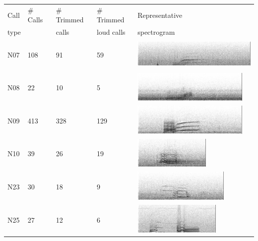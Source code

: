 \documentclass[12pt,oneside]{book}
\begin{document}
\begin{table}
\begin{tabular}{|l|l|l|l|l|}
\hline
Call     &  \# Calls  & \# Trimmed & \# Trimmed         &  Representative  \\
type     &            & calls      & loud calls         &  spectrogram    \\
\hline
 N07     &   108      &             91  &   59                    &  \includegraphics[height=1.5cm] {figures/catalog/A08-N07-071110-D013-01151.png} \\ \hline
 N08     &   22       &             10  &    5                    &  \includegraphics[height=1.5cm] {figures/catalog/A04-N08-071906-D020-13145.png} \\ \hline
 N09     &   413      &            328  &  129                    &  \includegraphics[height=1.5cm] {figures/catalog/A12-N09-070102-D005-14103.png} \\ \hline
 N10     &   39       &             26  &   19                    &  \includegraphics[height=1.5cm] {figures/catalog/A36-N10-063002-D005-10954.png} \\ \hline
 N23     &   30       &             18  &    9                    &  \includegraphics[height=1.5cm] {figures/catalog/I31-N23-070706-D011-10950.png} \\ \hline
 N25     &   27       &             12  &    6                    &  \includegraphics[height=1.5cm] {figures/catalog/I15-N25-081206-D044-02059.png} \\ \hline

\end{tabular}
\end{table}
\end{document}
